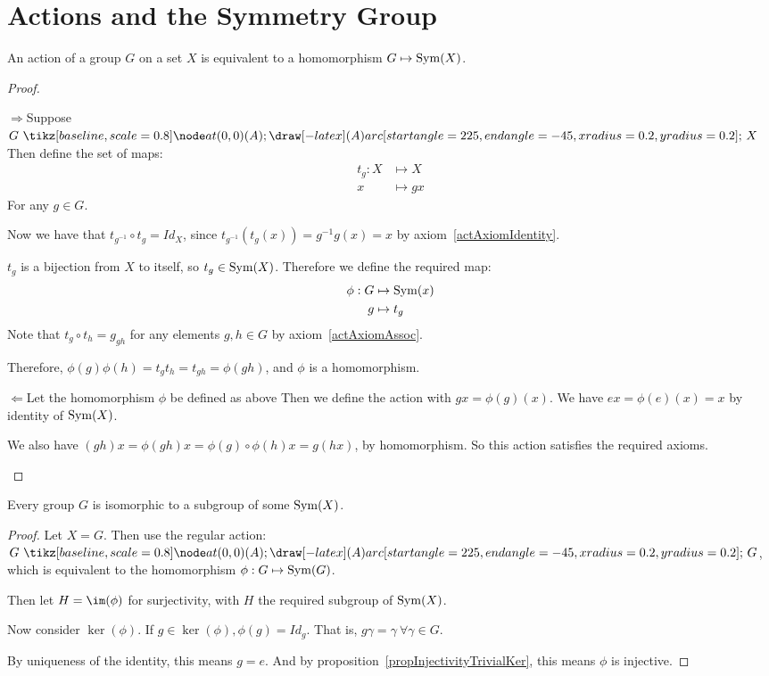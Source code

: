 \documentclass[../Main.tex]{subfiles}
\begin{document}
\section{Actions and the Symmetry Group}
\begin{theorem}
    An action of a group $G$ on a set $X$ is equivalent to a homomorphism $G \mapsto \operatorname{Sym}(X)$.
    \label{thmActionEquivHism}
\end{theorem}
\begin{proof}
    \begin{proofdirection}{$\Rightarrow$}{Suppose $G \actson X$}
        Then define the set of maps:
        \begin{align*}
            t_g : X &\mapsto X \\
            x &\mapsto gx
        \end{align*}        
        For any $g \in G$.\par
        Now we have that $t_{g^{-1}} \circ t_g = Id_X$, since $t_{g^{-1}}(t_g(x)) = g^{-1}g(x) = x$ by axiom~\ref{actAxiomIdentity}.\par
        $t_g$ is a bijection from $X$ to itself, so $t_g \in \operatorname{Sym}(X)$.
        Therefore we define the required map:
        \begin{align*}
            \phi : G &\mapsto \operatorname{Sym}(x) \\
            g &\mapsto t_g
        \end{align*}
        Note that $t_g \circ t_h = g_{gh}$ for any elements $g, h \in G$ by axiom~\ref{actAxiomAssoc}.\par
        Therefore, $\phi(g) \phi(h) = t_g t_h = t_{gh} = \phi(gh)$, and $\phi$ is a homomorphism.
    \end{proofdirection}
    \begin{proofdirection}{$\Leftarrow$}{Let the homomorphism $\phi$ be defined as above}
        Then we define the action with $gx = \phi(g)(x)$.        
        We have $ex = \phi(e)(x) = x$ by identity of $\operatorname{Sym}(X)$.\par
        We also have $(gh)x = \phi(gh)x = \phi(g) \circ \phi(h) x = g(hx)$, by homomorphism.
        So this action satisfies the required axioms.
    \end{proofdirection}
\end{proof}
\begin{theorem}
    Every group $G$ is isomorphic to a subgroup of some $\operatorname{Sym}(X)$.
    \label{thmCayley}
\end{theorem}
\begin{proof}
    Let $X = G$. Then use the regular action: $G \actson G$, which is equivalent to the homomorphism $\phi : G \mapsto \operatorname{Sym}(G)$.\par
    Then let $H = \im(\phi)$ for surjectivity, with $H$ the required subgroup of $\operatorname{Sym}(X)$.\par
    Now consider $\ker(\phi)$. If $g \in \ker(\phi), \phi(g) = Id_g$. That is, $g \gamma = \gamma~\forall \gamma \in G$.\par
    By uniqueness of the identity, this means $g = e$. And by proposition~\ref{propInjectivityTrivialKer}, this means $\phi$ is injective.
\end{proof}
\end{document}
